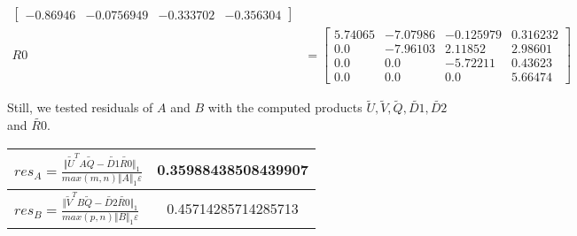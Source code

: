 \begin{example}
{\begin{enumerate}[(1).]
\begin{align*}
\begin{bmatrix}
      -0.86946 & -0.0756949 & -0.333702 & -0.356304
    \end{bmatrix} \\ 
    R0 &= \begin{bmatrix}
      5.74065 & -7.07986 & -0.125979 & 0.316232 \\
      0.0  &    -7.96103 &  2.11852 &  2.98601 \\ 
      0.0  &     0.0    &  -5.72211 &  0.43623 \\ 
      0.0  &     0.0    &   0.0     &  5.66474 
    \end{bmatrix} 
\end{align*}

Still, we tested residuals of $A$ and $B$ with the computed products $\tilde{U}, \tilde{V}, \tilde{Q}, \tilde{D1}, \tilde{D2}$ and $\tilde{R0}$.

\begin{center}
	\bgroup
	\def\arraystretch{2}%
		\begin{tabular}{| m{}|| c |}
			\hline
    			$res_{A} = \frac{\Vert \tilde{U}^TA\tilde{Q} - \tilde{D1}\tilde{R0}\Vert_1}{max(m,n)\Vert A \Vert_1 \varepsilon}$ & 0.35988438508439907 \\ \hline
				$res_{B} = \frac{\Vert \tilde{V}^TB\tilde{Q} - \tilde{D2}\tilde{R0}\Vert_1}{max(p,n)\Vert B \Vert_1 \varepsilon}$ & 0.45714285714285713 \\ 
			\hline
		\end{tabular}
	\egroup
\end{center}

\end{enumerate} 

}\end{example} 

